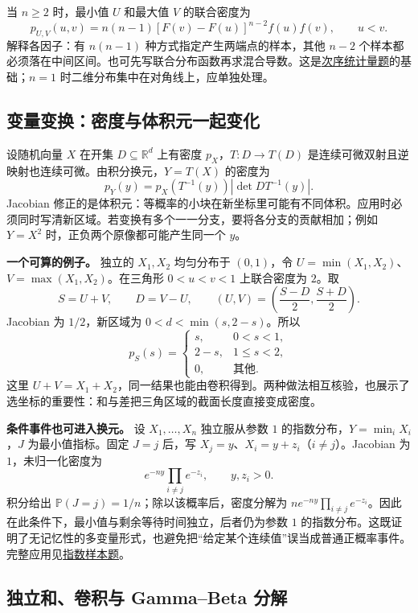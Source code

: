 当 $n\ge2$ 时，最小值 $U$ 和最大值 $V$ 的联合密度为
\[
p_{U,V}(u,v)=n(n-1)[F(v)-F(u)]^{n-2}f(u)f(v),\qquad u<v.
\]
解释各因子：有 $n(n-1)$ 种方式指定产生两端点的样本，其他 $n-2$ 个样本都必须落在中间区间。也可先写联合分布函数再求混合导数。这是\hyperref[pr:fin09-hi:13]{次序统计量题}的基础；$n=1$ 时二维分布集中在对角线上，应单独处理。

\subsection{变量变换：密度与体积元一起变化}

\label{app:probability-transforms}

设随机向量 $X$ 在开集 $D\subseteq\mathbb R^d$ 上有密度 $p_X$，$T:D\to T(D)$ 是连续可微双射且逆映射也连续可微。由积分换元，$Y=T(X)$ 的密度为
\[
p_Y(y)=p_X(T^{-1}(y))\left|\det DT^{-1}(y)\right|.
\]
Jacobian 修正的是体积元：等概率的小块在新坐标里可能有不同体积。应用时必须同时写清新区域。若变换有多个一一分支，要将各分支的贡献相加；例如 $Y=X^2$ 时，正负两个原像都可能产生同一个 $y$。

\textbf{一个可算的例子。} 独立的 $X_1,X_2$ 均匀分布于 $(0,1)$，令 $U=\min(X_1,X_2)$、$V=\max(X_1,X_2)$。在三角形 $0<u<v<1$ 上联合密度为 $2$。取
\[
S=U+V,\qquad D=V-U,
\qquad (U,V)=\left(\frac{S-D}{2},\frac{S+D}{2}\right).
\]
Jacobian 为 $1/2$，新区域为 $0<d<\min(s,2-s)$。所以
\[
p_S(s)=\begin{cases}s,&0<s<1,\\2-s,&1\le s<2,\\0,&\text{其他}.
\end{cases}
\]
这里 $U+V=X_1+X_2$，同一结果也能由卷积得到。两种做法相互核验，也展示了选坐标的重要性：和与差把三角区域的截面长度直接变成密度。

\textbf{条件事件也可进入换元。} 设 $X_1,\ldots,X_n$ 独立服从参数 $1$ 的指数分布，$Y=\min_iX_i$，$J$ 为最小值指标。固定 $J=j$ 后，写 $X_j=y$、$X_i=y+z_i$（$i\ne j$）。Jacobian 为 $1$，未归一化密度为
\[
e^{-ny}\prod_{i\ne j}e^{-z_i},\qquad y,z_i>0.
\]
积分给出 $\mathbb P(J=j)=1/n$；除以该概率后，密度分解为 $ne^{-ny}\prod_{i\ne j}e^{-z_i}$。因此在此条件下，最小值与剩余等待时间独立，后者仍为参数 $1$ 的指数分布。这既证明了无记忆性的多变量形式，也避免把“给定某个连续值”误当成普通正概率事件。完整应用见\hyperref[pr:fin16-high:12]{指数样本题}。

\subsection{独立和、卷积与 Gamma–Beta 分解}

